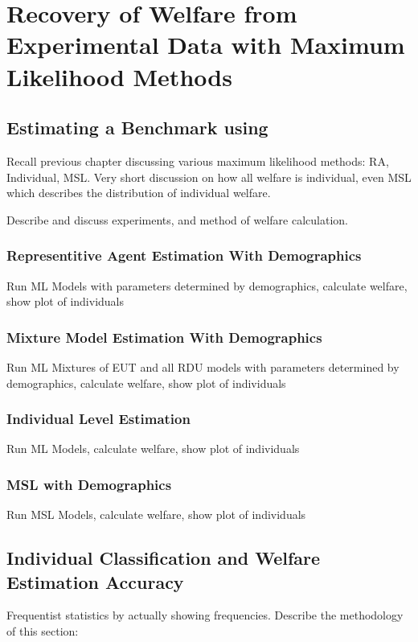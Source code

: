 \documentclass[../main.tex]{subfiles}
\begin{document}
\onehalfspacing
\setcounter{chapter}{3}

\chapter{Recovery of Welfare from Experimental Data with Maximum Likelihood Methods}

\lltoc %

\section{Estimating a Benchmark using \texorpdfstring{\textcite{Harrison2016}}{Harrison and Ng (2016)}}
	
	Recall previous chapter discussing various maximum likelihood methods: RA, Individual, MSL.
	Very short discussion on how all welfare is individual, even MSL which describes the distribution of individual welfare.

	Describe and discuss \textcite{Harrison2016} experiments, and method of welfare calculation.

	\subsection{Representitive Agent Estimation With Demographics}
		Run ML Models with parameters determined by demographics, calculate welfare, show plot of individuals
	\subsection{Mixture Model Estimation With Demographics}
		Run ML Mixtures of EUT and all RDU models with parameters determined by demographics, calculate welfare, show plot of individuals
	\subsection{Individual Level Estimation}
		Run ML Models, calculate welfare, show plot of individuals
	\subsection{MSL with Demographics}
		Run MSL Models, calculate welfare, show plot of individuals

\section{Individual Classification and Welfare Estimation Accuracy}
	Frequentist statistics by actually showing frequencies.
	Describe the methodology of this section:
\end{document}
